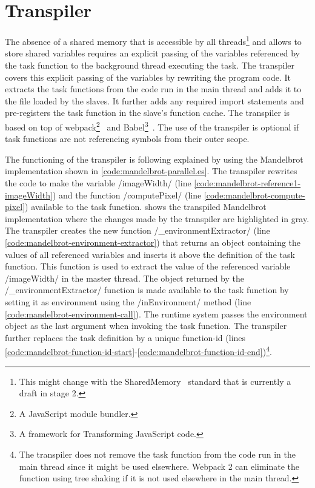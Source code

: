 \section{Transpiler}\label{sec:transpiler}
The absence of a shared memory that is accessible by all threads\footnote{This might change with the SharedMemory~\cite{Ecma2016} standard that is currently a draft in stage 2.} and allows to store shared variables requires an explicit passing of the variables referenced by the task function to the background thread executing the task. The transpiler covers this explicit passing of the variables by rewriting the program code. It extracts the task functions from the code run in the main thread and adds it to the file loaded by the slaves. It further adds any required import statements and pre-registers the task function in the slave's function cache. The transpiler is based on top of webpack\footnote{A JavaScript module bundler.}~\cite{webpack} and Babel\footnote{A framework for Transforming JavaScript code.}~\cite{babel}. The use of the transpiler is optional if task functions are not referencing symbols from their outer scope. 


The functioning of the transpiler is following explained by using the Mandelbrot implementation shown in \cref{code:mandelbrot-parallel.es}. The transpiler rewrites the code to make the variable \javascriptinline/imageWidth/ (line \ref{code:mandelbrot-reference1-imageWidth}) and the function \javascriptinline/computePixel/ (line \ref{code:mandelbrot-compute-pixel}) available to the task function.  shows the transpiled Mandelbrot implementation where the changes made by the transpiler are highlighted in gray. The transpiler creates the new function \javascriptinline/_environmentExtractor/ (line \ref{code:mandelbrot-environment-extractor}) that returns an object containing the values of all referenced variables and inserts it above the definition of the task function. This function is used to extract the value of the referenced variable \javascriptinline/imageWidth/ in the master thread. The object returned by the \javascriptinline/_environmentExtractor/ function is made available to the task function by setting it as environment using the \javascriptinline/inEnvironment/ method (line \ref{code:mandelbrot-environment-call}). The runtime system passes the environment object as the last argument when invoking the task function. The transpiler further replaces the task definition by a unique function-id (lines \ref{code:mandelbrot-function-id-start}-\ref{code:mandelbrot-function-id-end})\footnote{The transpiler does not remove the task function from the code run in the main thread since it might be used elsewhere. Webpack 2 can eliminate the function using tree shaking if it is not used elsewhere in the main thread.}. 

